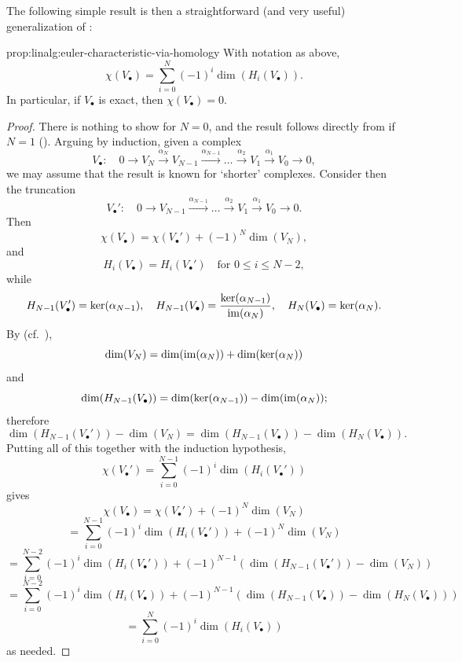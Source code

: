 The following simple result is then a straightforward (and very
useful) generalization of :
\begin{prop}{}{prop:linalg:euler-characteristic-via-homology}
  With notation as above,
  \[
    \chi(V_\bullet) = \sum_{i=0}^N (-1)^i \dim(H_i(V_\bullet)).
  \]
  In particular, if $V_\bullet$ is exact, then $\chi(V_\bullet) = 0$.
\end{prop}
\begin{proof}
  There is nothing to show for $N = 0$, and the result follows
  directly from  if $N = 1$
  (). Arguing by induction,
  given a complex
  \[
    V_\bullet : \quad 0 \to V_N \xrightarrow{\alpha_N} V_{N-1}
    \xrightarrow{\alpha_{N-1}} \dots \xrightarrow{\alpha_2} V_1
    \xrightarrow{\alpha_1} V_0 \to 0,
  \]
  we may assume that the result is known for `shorter' complexes.
  Consider then the truncation
  \[
    V_\bullet' : \quad 0 \to V_{N-1} \xrightarrow{\alpha_{N-1}} \dots
    \xrightarrow{\alpha_2} V_1 \xrightarrow{\alpha_1} V_0 \to 0.
  \]
  Then
  \[
    \chi(V_\bullet) = \chi(V_\bullet') + (-1)^N \dim(V_N),
  \]
  and
  \[
    H_i(V_\bullet) = H_i(V_\bullet') \quad \text{for } 0 \leq i \leq
    N-2,
  \]
  while
  \[
    H_{N-1}(V_\bullet') = \ker(\alpha_{N-1}), \quad H_{N-1}(V_\bullet)
    = \frac{\ker(\alpha_{N-1})}{\operatorname{im}(\alpha_N)}, \quad
    H_N(V_\bullet) = \ker(\alpha_N).
  \]
  By  (cf.\ ),
  \[
    \dim(V_N) = \dim(\operatorname{im}(\alpha_N)) + \dim(\ker(\alpha_N))
  \]
  and
  \[
    \dim(H_{N-1}(V_\bullet)) = \dim(\ker(\alpha_{N-1})) -
    \dim(\operatorname{im}(\alpha_N));
  \]
  therefore
  \[
    \dim(H_{N-1}(V_\bullet')) - \dim(V_N) = \dim(H_{N-1}(V_\bullet)) -
    \dim(H_N(V_\bullet)).
  \]
  Putting all of this together with the induction hypothesis,
  \[
    \chi(V_\bullet') = \sum_{i=0}^{N-1} (-1)^i \dim(H_i(V_\bullet'))
  \]
  gives
  \[
    \chi(V_\bullet) = \chi(V_\bullet') + (-1)^N \dim(V_N)
  \]
  \[
    = \sum_{i=0}^{N-1} (-1)^i \dim(H_i(V_\bullet')) + (-1)^N \dim(V_N)
  \]
  \[
    = \sum_{i=0}^{N-2} (-1)^i \dim(H_i(V_\bullet')) + (-1)^{N-1}
    (\dim(H_{N-1}(V_\bullet')) - \dim(V_N))
  \]
  \[
    = \sum_{i=0}^{N-2} (-1)^i \dim(H_i(V_\bullet)) + (-1)^{N-1}
    (\dim(H_{N-1}(V_\bullet)) - \dim(H_N(V_\bullet)))
  \]
  \[
    = \sum_{i=0}^N (-1)^i \dim(H_i(V_\bullet))
  \]
  as needed.
\end{proof}

